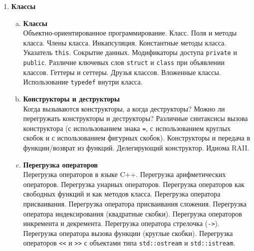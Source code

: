 \documentclass{article}
\begin{document}
\begin{enumerate}
\begin{enumerate}[a.]
\item \textbf{Приведение типов в C++}\\
Опасность приведения в стиле C. 
Оператор приведения \texttt{static\_cast}. Отличие приведения типов с помощью оператора \texttt{static\_cast} от приведения типов в стиле C. То есть чем
\begin{lstlisting}
static_cast<type>(a)
\end{lstlisting}
отличается от:
\begin{lstlisting}
(type)(a)
\end{lstlisting}
Оператор приведения \texttt{reinterpret\_cast}. 
Оператор приведения \texttt{const\_cast}.
\end{enumerate}



\item \textbf{Классы}

\begin{enumerate}[a.]

\item \textbf{Классы}\\
Объектно-ориентированное программирование. Класс. Поля и методы класса. Члены класса.
Инкапсуляция. Константные методы класса. Указатель \texttt{this}. Сокрытие данных. Модификаторы доступа \texttt{private} и \texttt{public}. Различие ключевых слов \texttt{struct} и \texttt{class} при объявлении классов.
Геттеры и сеттеры. Друзья классов. Вложенные классы. Использование \texttt{typedef} внутри класса.

\item \textbf{Конструкторы и деструкторы}\\
Когда вызываются конструкторы, а когда деструкторы? Можно ли перегружать конструкторы и деструкторы? Различные синтаксисы вызова конструктора (с использованием знака \texttt{=}, с использованием круглых скобок и с использованием фигурных скобок). Конструкторы и передача в функции/возврат из функций. Делегирующий конструктор. Идиома RAII. 


\item \textbf{Перегрузка операторов}\\
Перегрузка операторов в языке C++. Перегрузка арифметических операторов. Перегрузка унарных операторов. Перегрузка операторов как свободных функций и как методов класса. Перегрузка оператора присваивания. Перегрузка оператора присваивания сложения.  Перегрузка оператора индексирования (квадратные скобки). Перегрузка операторов инкремента и декремента. Перегрузка оператора стрелочка (\texttt{->}). Перегрузка оператора вызова функции (круглые скобки). Перегрузка операторов \verb|<<| и \verb|>>| с объектами типа \texttt{std::ostream} и \texttt{std::istream}. 



\end{enumerate}
\end{enumerate}
\end{document}
